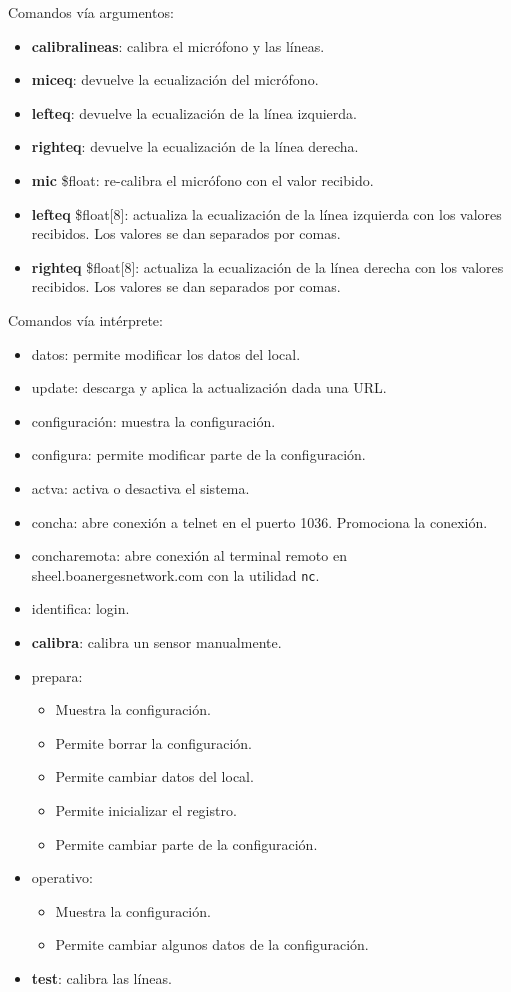 Comandos vía argumentos:
\begin{itemize}
	\item \textbf{calibralineas}: calibra el micrófono y las líneas.
	\item \textbf{miceq}: devuelve la ecualización del micrófono.
	\item \textbf{lefteq}: devuelve la ecualización de la línea izquierda.
	\item \textbf{righteq}: devuelve la ecualización de la línea derecha.
	\item \textbf{mic} \$float: re-calibra el micrófono con el valor recibido.
	\item \textbf{lefteq} \$float[8]: actualiza la ecualización de la línea izquierda con los valores recibidos.
		\subitem Los valores se dan separados por comas.
	\item \textbf{righteq} \$float[8]: actualiza la ecualización de la línea derecha con los valores recibidos.
		\subitem Los valores se dan separados por comas.
\end{itemize}

Comandos vía intérprete:
\begin{itemize}
	\item datos: permite modificar los datos del local.
	\item update: descarga y aplica la actualización dada una URL.
	\item configuración: muestra la configuración.
	\item configura: permite modificar parte de la configuración.
	\item actva: activa o desactiva el sistema.
	\item concha: abre conexión a telnet en el puerto 1036. Promociona la conexión.
	\item concharemota: abre conexión al terminal remoto en sheel.boanergesnetwork.com con la utilidad \verb|nc|.
	\item identifica: login.
	\item \textbf{calibra}: calibra un sensor manualmente.
	\item prepara:
		\begin{itemize}
			\item Muestra la configuración.
			\item Permite borrar la configuración.
			\item Permite cambiar datos del local.
			\item Permite inicializar el registro.
			\item Permite cambiar parte de la configuración.
		\end{itemize}
	\item operativo:
		\begin{itemize}
			\item Muestra la configuración.
			\item Permite cambiar algunos datos de la configuración.
		\end{itemize}
	\item \textbf{test}: calibra las líneas.
\end{itemize}